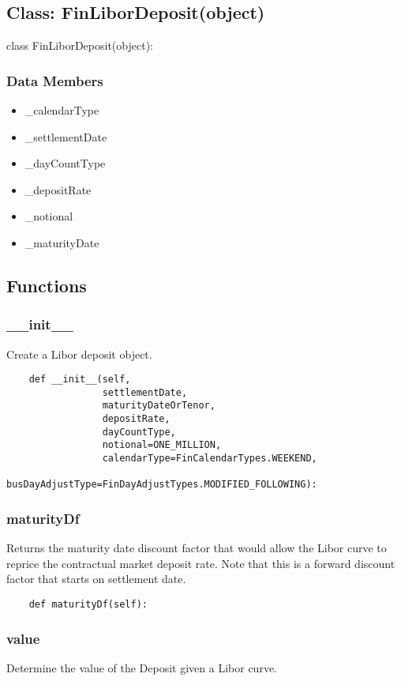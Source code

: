 \documentclass[twoside,11pt]{book}
\begin{document}
\subsection*{Class: FinLiborDeposit(object)}
class FinLiborDeposit(object): 

\subsubsection*{Data Members}
\begin{itemize}
\item{\_calendarType}
\item{\_settlementDate}
\item{\_dayCountType}
\item{\_depositRate}
\item{\_notional}
\item{\_maturityDate}
\end{itemize}

\subsection*{Functions}

\subsubsection*{{\bf \_\_init\_\_}}
Create a Libor deposit object.  

\begin{lstlisting}
    def __init__(self,
                 settlementDate,
                 maturityDateOrTenor,
                 depositRate,
                 dayCountType,
                 notional=ONE_MILLION,
                 calendarType=FinCalendarTypes.WEEKEND,
                 busDayAdjustType=FinDayAdjustTypes.MODIFIED_FOLLOWING):
\end{lstlisting}

\subsubsection*{{\bf maturityDf}}
Returns the maturity date discount factor that would allow the Libor curve to reprice the contractual market deposit rate. Note that this is a forward discount factor that starts on settlement date. 

\begin{lstlisting}
    def maturityDf(self):
\end{lstlisting}

\subsubsection*{{\bf value}}
Determine the value of the Deposit given a Libor curve.  
\end{document}
